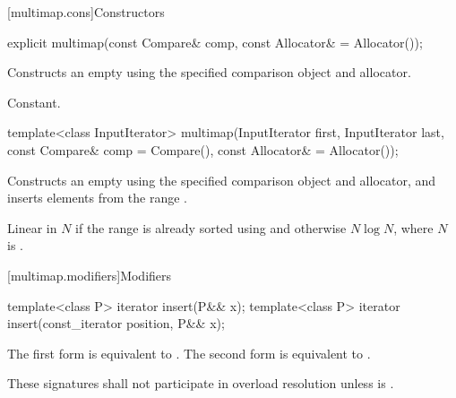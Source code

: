 %

[multimap.cons]{Constructors}

%
\begin{itemdecl}
explicit multimap(const Compare& comp, const Allocator& = Allocator());
\end{itemdecl}

\begin{itemdescr}
\pnum
\effects
Constructs an empty
using the specified comparison object and allocator.

\pnum
\complexity
Constant.
\end{itemdescr}

%
\begin{itemdecl}
template<class InputIterator>
  multimap(InputIterator first, InputIterator last,
           const Compare& comp = Compare(),
           const Allocator& = Allocator());
\end{itemdecl}

\begin{itemdescr}
\pnum
\effects
Constructs an empty
using the specified comparison object and allocator,
and inserts elements from the range
.

\pnum
\complexity
Linear in $N$ if the range
is already sorted using 
and otherwise $N \log N$,
where $N$ is
.
\end{itemdescr}

[multimap.modifiers]{Modifiers}

%
\begin{itemdecl}
template<class P> iterator insert(P&& x);
template<class P> iterator insert(const_iterator position, P&& x);
\end{itemdecl}

\begin{itemdescr}
\pnum
\effects
The first form is equivalent to
. The second form is
equivalent to .

\pnum
\remarks
These signatures shall not participate in overload resolution
unless  is
.
\end{itemdescr}

